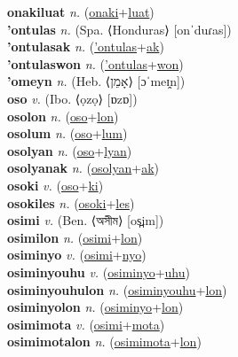 \textbf{onakiluat} \textit{n.} (\hyperref[onaki]{onaki}+\hyperref[luat]{luat})
 \label{onakiluat} \\
\textbf{'ontulas} \textit{n.} (Spa. ⟨Honduras⟩ [onˈduɾas])
 \label{'ontulas} \\
\textbf{'ontulasak} \textit{n.} (\hyperref['ontulas]{'ontulas}+\hyperref[ak]{ak})
 \label{'ontulasak} \\
\textbf{'ontulaswon} \textit{n.} (\hyperref['ontulas]{'ontulas}+\hyperref[won]{won})
 \label{'ontulaswon} \\
\textbf{'omeyn} \textit{n.} (Heb. ⟨אָמֵן⟩ [ɔˈmeɪ̯n])
 \label{'omeyn} \\
\textbf{oso} \textit{v.} (Ibo. ⟨ọzọ⟩ [ɒzɒ])
 \label{oso} \\
\textbf{osolon} \textit{n.} (\hyperref[oso]{oso}+\hyperref[lon]{lon})
 \label{osolon} \\
\textbf{osolum} \textit{n.} (\hyperref[oso]{oso}+\hyperref[lum]{lum})
 \label{osolum} \\
\textbf{osolyan} \textit{n.} (\hyperref[oso]{oso}+\hyperref[lyan]{lyan})
 \label{osolyan} \\
\textbf{osolyanak} \textit{n.} (\hyperref[osolyan]{osolyan}+\hyperref[ak]{ak})
 \label{osolyanak} \\
\textbf{osoki} \textit{v.} (\hyperref[oso]{oso}+\hyperref[ki]{ki})
 \label{osoki} \\
\textbf{osokiles} \textit{n.} (\hyperref[osoki]{osoki}+\hyperref[les]{les})
 \label{osokiles} \\
\textbf{osimi} \textit{v.} (Ben. ⟨অসীম⟩ [os̪im])
 \label{osimi} \\
\textbf{osimilon} \textit{n.} (\hyperref[osimi]{osimi}+\hyperref[lon]{lon})
 \label{osimilon} \\
\textbf{osiminyo} \textit{v.} (\hyperref[osimi]{osimi}+\hyperref[nyo]{nyo})
 \label{osiminyo} \\
\textbf{osiminyouhu} \textit{v.} (\hyperref[osiminyo]{osiminyo}+\hyperref[uhu]{uhu})
 \label{osiminyouhu} \\
\textbf{osiminyouhulon} \textit{n.} (\hyperref[osiminyouhu]{osiminyouhu}+\hyperref[lon]{lon})
 \label{osiminyouhulon} \\
\textbf{osiminyolon} \textit{n.} (\hyperref[osiminyo]{osiminyo}+\hyperref[lon]{lon})
 \label{osiminyolon} \\
\textbf{osimimota} \textit{v.} (\hyperref[osimi]{osimi}+\hyperref[mota]{mota})
 \label{osimimota} \\
\textbf{osimimotalon} \textit{n.} (\hyperref[osimimota]{osimimota}+\hyperref[lon]{lon})
